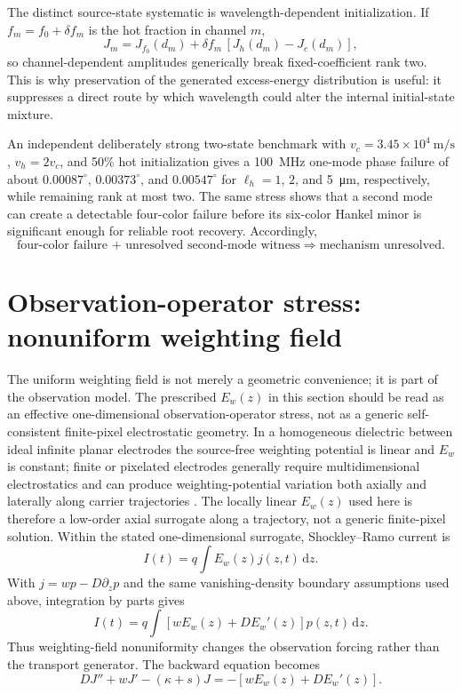 \documentclass[11pt]{article}
\newcommand{\dd}{\mathrm{d}}
\begin{document}
The distinct source-state systematic is wavelength-dependent initialization. If $f_m=f_0+\delta f_m$ is the hot fraction in channel $m$,
\begin{equation}
J_m=J_{f_0}(d_m)+\delta f_m\,[J_h(d_m)-J_c(d_m)],
\end{equation}
so channel-dependent amplitudes generically break fixed-coefficient rank two. This is why preservation of the generated excess-energy distribution is useful: it suppresses a direct route by which wavelength could alter the internal initial-state mixture.

An independent deliberately strong two-state benchmark with $v_c=3.45\times10^4~\mathrm{m/s}$, $v_h=2v_c$, and 50\% hot initialization gives a \SI{100}{MHz} one-mode phase failure of about $0.00087^\circ$, $0.00373^\circ$, and $0.00547^\circ$ for $\ell_h=1$, $2$, and \SI{5}{\micro\meter}, respectively, while remaining rank at most two. The same stress shows that a second mode can create a detectable four-color failure before its six-color Hankel minor is significant enough for reliable root recovery. Accordingly,
\begin{equation*}
\boxed{\text{four-color failure + unresolved second-mode witness}\Rightarrow\text{mechanism unresolved}.}
\end{equation*}

\section{Observation-operator stress: nonuniform weighting field}

The uniform weighting field is not merely a geometric convenience; it is part of the observation model. The prescribed $E_w(z)$ in this section should be read as an effective one-dimensional observation-operator stress, not as a generic self-consistent finite-pixel electrostatic geometry. In a homogeneous dielectric between ideal infinite planar electrodes the source-free weighting potential is linear and $E_w$ is constant; finite or pixelated electrodes generally require multidimensional electrostatics and can produce weighting-potential variation both axially and laterally along carrier trajectories \cite{Eskin1999}. The locally linear $E_w(z)$ used here is therefore a low-order axial surrogate along a trajectory, not a generic finite-pixel solution. Within the stated one-dimensional surrogate, Shockley--Ramo current is
\begin{equation}
I(t)=q\int E_w(z)j(z,t)\,\dd z.
\end{equation}
With $j=wp-D\partial_zp$ and the same vanishing-density boundary assumptions used above, integration by parts gives
\begin{equation}
\boxed{I(t)=q\int\left[wE_w(z)+DE_w'(z)\right]p(z,t)\,\dd z.}
\label{eq:weighting_operator}
\end{equation}
Thus weighting-field nonuniformity changes the observation forcing rather than the transport generator. The backward equation becomes
\begin{equation}
\boxed{DJ''+wJ'-(\kappa+s)J=-\left[wE_w(z)+DE_w'(z)\right].}
\label{eq:weighting_bvp}
\end{equation}
\end{document}
